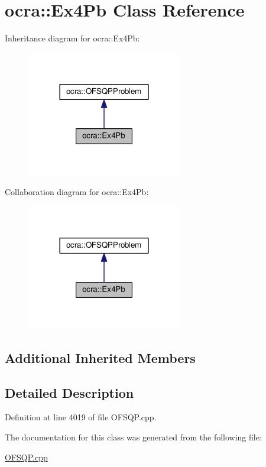\hypertarget{classocra_1_1Ex4Pb}{}\section{ocra\+:\+:Ex4\+Pb Class Reference}
\label{classocra_1_1Ex4Pb}


Inheritance diagram for ocra\+:\+:Ex4\+Pb\+:
\nopagebreak
\begin{figure}[H]
\begin{center}
\leavevmode
\includegraphics[width=192pt]{d1/d91/classocra_1_1Ex4Pb__inherit__graph}
\end{center}
\end{figure}


Collaboration diagram for ocra\+:\+:Ex4\+Pb\+:
\nopagebreak
\begin{figure}[H]
\begin{center}
\leavevmode
\includegraphics[width=192pt]{df/d37/classocra_1_1Ex4Pb__coll__graph}
\end{center}
\end{figure}
\subsection*{Additional Inherited Members}


\subsection{Detailed Description}


Definition at line 4019 of file O\+F\+S\+Q\+P.\+cpp.



The documentation for this class was generated from the following file\+:\begin{DoxyCompactItemize}
\item 
\hyperlink{OFSQP_8cpp}{O\+F\+S\+Q\+P.\+cpp}\end{DoxyCompactItemize}
